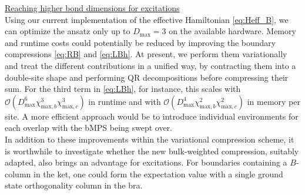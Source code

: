 \noindent \underline{Reaching higher bond dimensions for excitations} \\[0.5em]
Using our current implementation of the effective Hamiltonian \eqref{eq:Heff_B}, we can optimize the ansatz only up to $D_{\text{max}} = 3$ on the available hardware. Memory and runtime costs could potentially be reduced by improving the boundary compressions \eqref{eq:RB} and \eqref{eq:LBh}. At present, we perform them variationally and treat the different contributions in a unified way, by contracting them into a double-site shape and performing QR decompositions before compressing their sum. For the third term in \eqref{eq:LBh}, for instance, this scales with $\mathcal{O}( D_{\text{max}}^6 \chi_{\text{max}, b}^3 \chi_{\text{max}, c}^3)$ in runtime and with $\mathcal{O}( D_{\text{max}}^4 \chi_{\text{max}, b}^2 \chi_{\text{max}, c}^2)$ in memory per site. A more efficient approach would be to introduce individual environments for each overlap with the bMPS being swept over. \\
In addition to these improvements within the variational compression scheme, it is worthwhile to investigate whether the new bulk-weighted compression, suitably adapted, also brings an advantage for excitations. For boundaries containing a $B$-column in the ket, one could form the expectation value with a single ground state orthogonality column in the bra. \\[1em]

